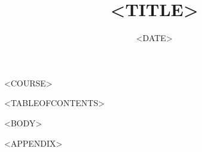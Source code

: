 \documentclass[12pt]{article}
\title{<TITLE>}
\date{<DATE>}  %
\newcommand {\coursetitle }[1]{
    \begin{center}
    {\normalsize {#1}}  %
    \end{center}
}
\begin{document}
\maketitle
\coursetitle{<COURSE>}


<TABLEOFCONTENTS>


\clearpage


<BODY>




\clearpage
\printbibliography


<APPENDIX>
\end{document}
